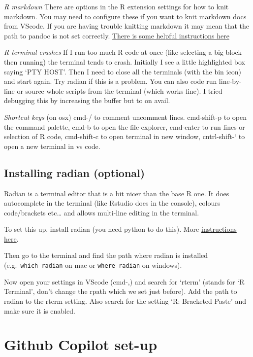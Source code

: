 \documentclass[
  letterpaper,
  DIV=11,
  numbers=noendperiod]{scrreprt}
\begin{document}
\emph{R markdown} There are options in the R extension settings for how
to knit markdown. You may need to configure these if you want to knit
markdown docs from VScode. If you are having trouble knitting markdown
it may mean that the path to pandoc is not set correctly.
\href{https://stackoverflow.com/questions/60766646/need-help-assigning-global-settings-for-rstudios-pandoc-in-vscode-to-knit-pdf-d}{There
is some helpful instructions here}

\emph{R terminal crashes} If I run too much R code at once (like
selecting a big block then running) the terminal tends to crash.
Initially I see a little highlighted box saying `PTY HOST'. Then I need
to close all the terminals (with the bin icon) and start again. Try
radian if this is a problem. You can also code run line-by-line or
source whole scripts from the terminal (which works fine). I tried
debugging this by increasing the buffer but to on avail.

\emph{Shortcut keys} (on osx) cmd-/ to comment uncomment lines.
cmd-shift-p to open the command palette, cmd-b to open the file
explorer, cmd-enter to run lines or selection of R code, cmd-shift-c to
open terminal in new window, cntrl-shift-` to open a new terminal in vs
code.

\subsection{Installing radian
(optional)}\label{installing-radian-optional}

Radian is a terminal editor that is a bit nicer than the base R one. It
does autocomplete in the terminal (like Rstudio does in the console),
colours code/brackets etc\ldots{} and allows multi-line editing in the
terminal.

To set this up, install radian (you need python to do this). More
\href{https://github.com/randy3k/radian?tab=readme-ov-file}{instructions
here}.

Then go to the terminal and find the path where radian is installed
(e.g.~\texttt{which\ radian} on mac or \texttt{where\ radian} on
windows).

Now open your settings in VScode (cmd-,) and search for `rterm' (stands
for `R Terminal', don't change the rpath which we set just before). Add
the path to radian to the rterm setting. Also search for the setting `R:
Bracketed Paste' and make sure it is enabled.

\section{Github Copilot set-up}\label{sec-githubcopilot}
\end{document}
